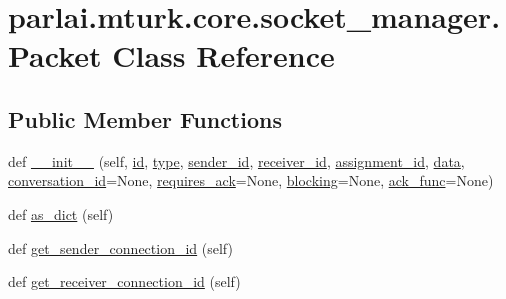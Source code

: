 \hypertarget{classparlai_1_1mturk_1_1core_1_1socket__manager_1_1Packet}{}\section{parlai.\+mturk.\+core.\+socket\+\_\+manager.\+Packet Class Reference}
\label{classparlai_1_1mturk_1_1core_1_1socket__manager_1_1Packet}
\subsection*{Public Member Functions}
\begin{DoxyCompactItemize}
\item 
def \hyperlink{classparlai_1_1mturk_1_1core_1_1socket__manager_1_1Packet_a25f1f794ffd01fb70e9b6b8acd0a33be}{\+\_\+\+\_\+init\+\_\+\+\_\+} (self, \hyperlink{classparlai_1_1mturk_1_1core_1_1socket__manager_1_1Packet_ad10710f49279e55b1011f585fd07bc22}{id}, \hyperlink{classparlai_1_1mturk_1_1core_1_1socket__manager_1_1Packet_a6fbd30031c46914f55a9ccdec5b0c8a3}{type}, \hyperlink{classparlai_1_1mturk_1_1core_1_1socket__manager_1_1Packet_ae1bd1f29599a19fd8c64e2ef01ab77b4}{sender\+\_\+id}, \hyperlink{classparlai_1_1mturk_1_1core_1_1socket__manager_1_1Packet_ab45007199f720f99765a49771df71c58}{receiver\+\_\+id}, \hyperlink{classparlai_1_1mturk_1_1core_1_1socket__manager_1_1Packet_a1638aa8fb2f521dcc47a3c70bb4629d0}{assignment\+\_\+id}, \hyperlink{classparlai_1_1mturk_1_1core_1_1socket__manager_1_1Packet_a0da381513a2cef8db0a5cac7825aa8f4}{data}, \hyperlink{classparlai_1_1mturk_1_1core_1_1socket__manager_1_1Packet_a1131b2ba6f1534a3edd9f704ae5db107}{conversation\+\_\+id}=None, \hyperlink{classparlai_1_1mturk_1_1core_1_1socket__manager_1_1Packet_af0fd46eb878559d3ea82993aa4c2ad9a}{requires\+\_\+ack}=None, \hyperlink{classparlai_1_1mturk_1_1core_1_1socket__manager_1_1Packet_ace59fc70911f5349259a6e09541ef776}{blocking}=None, \hyperlink{classparlai_1_1mturk_1_1core_1_1socket__manager_1_1Packet_a676008ae4aaa55d7551a94d246b1b931}{ack\+\_\+func}=None)
\item 
def \hyperlink{classparlai_1_1mturk_1_1core_1_1socket__manager_1_1Packet_a805fbc99169620a4a3c37a7892b5fab3}{as\+\_\+dict} (self)
\item 
def \hyperlink{classparlai_1_1mturk_1_1core_1_1socket__manager_1_1Packet_ad472844f177969be64004bc0fd7031d9}{get\+\_\+sender\+\_\+connection\+\_\+id} (self)
\item 
def \hyperlink{classparlai_1_1mturk_1_1core_1_1socket__manager_1_1Packet_af13faca81d70ad1768e6dd0089c8e082}{get\+\_\+receiver\+\_\+connection\+\_\+id} (self)

\end{DoxyCompactItemize}
